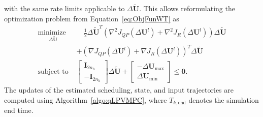 with the same rate limits applicable to $\Delta \tilde{\bm{U}}$. This allows reformulating the optimization problem from Equation~\eqref{eq:ObjFunWT} as
\begin{equation} \label{eq:ObjFunWTQP}
    \begin{aligned}
        \underset{\Delta \tilde{\bm{U}}}{\text{minimize }} & \quad
        \frac{1}{2} \Delta \tilde{\bm{U}}^T
        \left(\nabla^2 J_{QP} (\Delta \bm{U}^l) + \nabla^2 J_R(\Delta \bm{U}^l) \right) \Delta \tilde{\bm{U}} \\
        & + \left(\nabla J_{QP} (\Delta \bm{U}^l) + \nabla J_R(\Delta \bm{U}^l)\right)^T \Delta \tilde{\bm{U}} \\
        \text{subject to } & \begin{bmatrix} \bm{I}_{2n_h} \\ -\bm{I}_{2n_h} \end{bmatrix} \Delta \tilde{\bm{U}} +
        \begin{bmatrix} - \Delta \bm{U}_{\text{max}} \\ \Delta \bm{U}_{\text{min}} \end{bmatrix} \leq \bm{0}.
    \end{aligned}
\end{equation}
%
The updates of the estimated scheduling, state, and input trajectories are computed using Algorithm~\ref{algo:qLPVMPC}, where \(T_{k,\text{end}}\) denotes the simulation end time.

